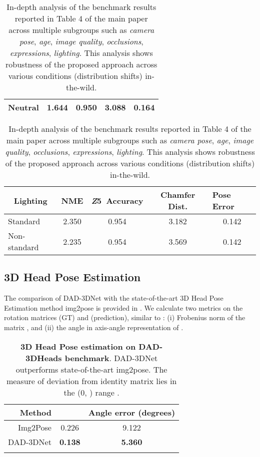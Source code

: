 \documentclass[10pt,twocolumn,letterpaper]{article}
\begin{document}
\begin{table}
\begin{tabular}{l|cccc}
Neutral                                   & 1.644                 & 0.950                                                    & 3.088                           & 0.164                                             \\
\bottomrule
\end{tabular}
\footnotesize
\begin{tabular}{l|cccc} 
\toprule
\multicolumn{1}{c}{\textbf{Lighting}} & \textbf{\textbf{NME}} & \textbf{\textbf{\textit{Z}5}}~\textbf{\textbf{Accuracy}} & \textbf{\textbf{Chamfer Dist.}} & \multicolumn{1}{l}{\textbf{\textbf{Pose Error}}}  \\ 
\toprule
Standard                                        & 2.350                 & 0.954                                                    & 3.182                           & 0.142                                             \\
Non-standard                                       & 2.235                 & 0.954                                                    & 3.569                           & 0.142                                             \\
\bottomrule
\end{tabular}
\caption{In-depth analysis of the benchmark results reported in Table 4 of the main paper across multiple subgroups such as \emph{camera pose}, \emph{age}, \emph{image quality}, \emph{occlusions}, \emph{expressions}, \emph{lighting}. This analysis shows robustness of the proposed approach across various conditions (distribution shifts) in-the-wild.}
\label{T:allmetrics}
\end{table} 

\subsection{3D Head Pose Estimation}

The comparison of DAD-3DNet with the state-of-the-art 3D Head Pose Estimation method img2pose \cite{img2pose} is provided in . We calculate two metrics on the rotation matrices  (GT) and  (prediction), similar to : (i) Frobenius norm of the matrix , and (ii) the angle in axis-angle representation of .




\begin{table}[t]
\footnotesize
\renewcommand{\arraystretch}{0.95}
\centering
\begin{tabular}{r|c|c}
\noalign{\smallskip}
Method &  & Angle error (degrees)\\
\hline
Img2Pose \cite{img2pose} & 0.226  & 9.122  \\
DAD-3DNet & \textbf{0.138} & \textbf{5.360} \\ 
\noalign{\smallskip}
\end{tabular}
\caption{\textbf{3D Head Pose estimation on DAD-3DHeads benchmark}. DAD-3DNet outperforms state-of-the-art img2pose\cite{img2pose}. The measure of  deviation from identity matrix lies in the (0, ) range \cite{rot_matrix_metrics}.}
\label{t:3dpose_img2pose_we}
\end{table}
 
\end{document}
